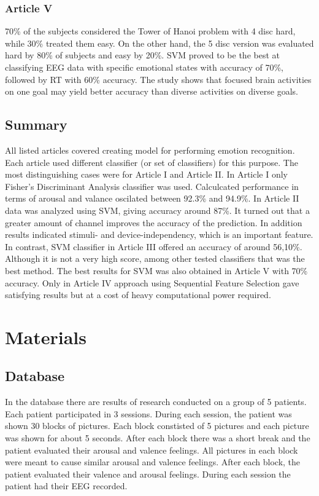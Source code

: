 \documentclass[10pt,journal,compsoc]{IEEEtran}
\begin{document}
\subsubsection*{Article V}
70\% of the subjects considered the Tower of Hanoi problem with 4 disc hard, while 30\% treated them easy. On the other hand, the 5 disc version was evaluated hard by 80\% of subjects and easy by 20\%. SVM proved to be the best at classifying EEG data with specific emotional states with accuracy of 70\%, followed by RT with 60\% accuracy. The study shows that focused brain activities on one goal may yield better accuracy than diverse activities on diverse goals.

\subsection{Summary}
All listed articles covered creating model for performing emotion recognition.
Each article used different classifier (or set of classifiers) for this purpose.
The most distinguishing cases were for Article I and Article II. In Article I only
Fisher's Discriminant Analysis classifier was used. Calculcated performance in terms
of arousal and valance oscilated between 92.3\% and 94.9\%. In Article II data was
analyzed using SVM, giving accuracy around 87\%. It turned out that a greater amount of
channel improves the accuracy of the prediction. In addition results indicated
stimuli- and device-independency, which is an important feature. In contrast, SVM
classifier in Article III offered an accuracy of around 56,10\%. Although it is not
a very high score, among other tested classifiers that was the best method. The best
results for SVM was also obtained in Article V with 70\% accuracy. Only in Article IV
approach using Sequential Feature Selection gave satisfying results but at a cost of
heavy computational power required. 

\section{Materials}

\subsection{Database}
In the database there are results of research conducted on a group of 5 patients. Each patient participated in 3 sessions. During each session, the patient was shown 30 blocks of pictures. Each block constisted of 5 pictures and each picture was shown for about 5 seconds. After each block there was a short break and the patient evaluated their arousal and valence feelings. All pictures in each block were meant to cause similar arousal and valence feelings. After each block, the patient evaluated their valence and arousal feelings. During each session the patient had their EEG recorded.
\end{document}
